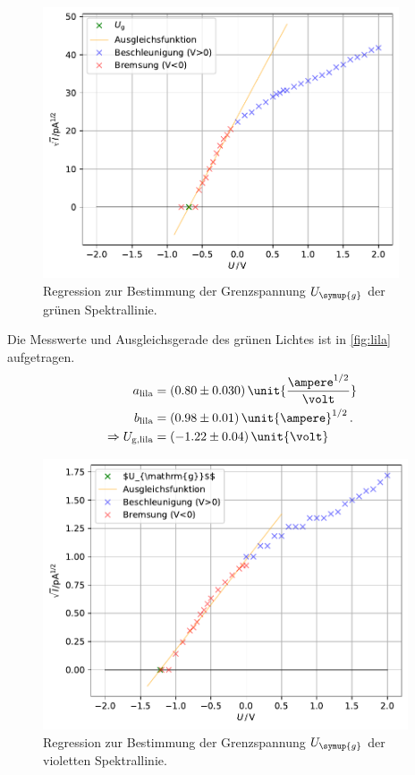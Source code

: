 \begin{figure}
    \centering
    \includegraphics[height = 8cm]{build/plotgruen.pdf}
    \caption{Regression zur Bestimmung der Grenzspannung $U_{\symup{g}}$ der grünen Spektrallinie.}
    \label{fig:gruen}
\end{figure}

Die Messwerte und Ausgleichsgerade des grünen Lichtes ist in \autoref{fig:lila} aufgetragen.
\begin{align*}
    a_{\text{lila}}&=(0.80\pm 0.030) \, \unit{\frac{\ampere ^{1/2}}{\volt}}\\
    b_{\text{lila}}&=(0.98\pm 0.01) \, \unit{\ampere}^{1/2}\, .\\
    \Rightarrow U_{\text{g,lila}}&=(-1.22\pm 0.04)\, \unit{\volt}\\
\end{align*}

\begin{figure}
    \centering
    \includegraphics[height = 8cm]{build/plotlila.pdf}
    \caption{Regression zur Bestimmung der Grenzspannung $U_{\symup{g}}$ der violetten Spektrallinie.}
    \label{fig:lila}
\end{figure}

